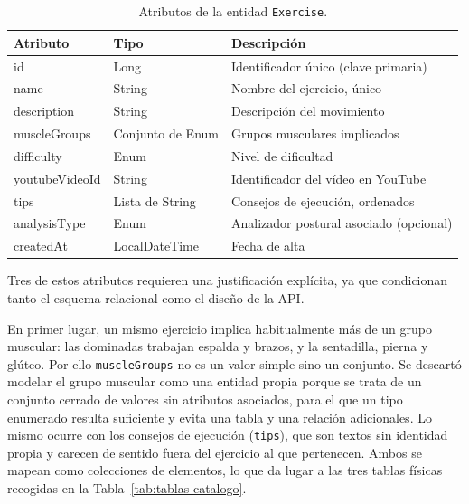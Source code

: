 \documentclass[12pt,a4paper,twoside,openright]{book}
\begin{document}
    \begin{table}[htbp]
        \centering
        \begin{tabular}{lll}
            \toprule
            \textbf{Atributo} & \textbf{Tipo} & \textbf{Descripción} \\
            \midrule
            id             & Long             & Identificador único (clave primaria) \\
            name           & String           & Nombre del ejercicio, único \\
            description    & String           & Descripción del movimiento \\
            muscleGroups   & Conjunto de Enum & Grupos musculares implicados \\
            difficulty     & Enum             & Nivel de dificultad \\
            youtubeVideoId & String           & Identificador del vídeo en YouTube \\
            tips           & Lista de String  & Consejos de ejecución, ordenados \\
            analysisType   & Enum             & Analizador postural asociado (opcional) \\
            createdAt      & LocalDateTime    & Fecha de alta \\
            \bottomrule
        \end{tabular}
        \caption{Atributos de la entidad \texttt{Exercise}.}
        \label{tab:entidad-exercise}
    \end{table}

    Tres de estos atributos requieren una justificación explícita, ya que
    condicionan tanto el esquema relacional como el diseño de la API.

    En primer lugar, un mismo ejercicio implica habitualmente más de un grupo
    muscular: las dominadas trabajan espalda y brazos, y la sentadilla, pierna
    y glúteo. Por ello \texttt{muscleGroups} no es un valor simple sino un
    conjunto. Se descartó modelar el grupo muscular como una entidad propia
    porque se trata de un conjunto cerrado de valores sin atributos asociados,
    para el que un tipo enumerado resulta suficiente y evita una tabla y una
    relación adicionales. Lo mismo ocurre con los consejos de ejecución
    (\texttt{tips}), que son textos sin identidad propia y carecen de sentido
    fuera del ejercicio al que pertenecen. Ambos se mapean como colecciones de
    elementos, lo que da lugar a las tres tablas físicas recogidas en la
    Tabla~\ref{tab:tablas-catalogo}.
\end{document}
